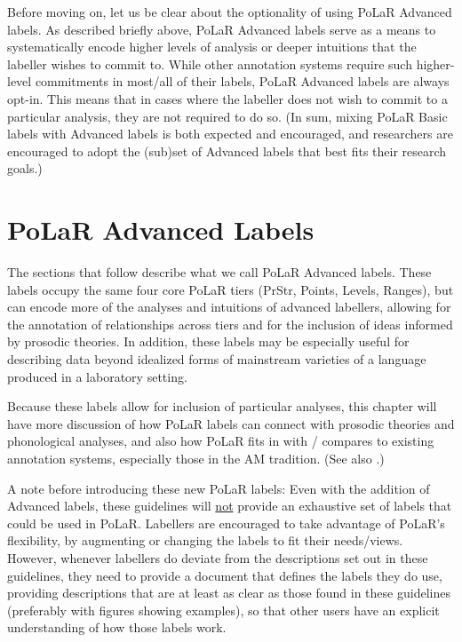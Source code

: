 Before moving on, let us be clear about the optionality of using PoLaR Advanced labels. As described briefly above, PoLaR Advanced labels serve as a means to systematically encode higher levels of analysis or deeper intuitions that the labeller wishes to commit to. While other annotation systems require such higher-level commitments in most\slash all of their labels, PoLaR Advanced labels are always opt-in. This means that in cases where the labeller does not wish to commit to a particular analysis, they are not required to do so. (In sum, mixing PoLaR Basic labels with Advanced labels is both expected and encouraged, and researchers are encouraged to adopt the (sub)set of Advanced labels that best fits their research goals.)

\section{PoLaR Advanced Labels}\label{sec:polar-advanced-labels}

The sections that follow describe what we call PoLaR Advanced labels. These labels occupy the same four core PoLaR tiers (PrStr, Points, Levels, Ranges), but can encode more of the analyses and intuitions of advanced labellers, allowing for the annotation of relationships across tiers and for the inclusion of ideas informed by prosodic theories. In addition, these labels may be especially useful for describing data beyond idealized forms of mainstream varieties of a language produced in a laboratory setting.

Because these labels allow for inclusion of particular analyses, this chapter will have more discussion of how PoLaR labels can connect with prosodic theories and phonological analyses, and also how PoLaR fits in with / compares to existing annotation systems, especially those in the AM tradition. (See also \citealt{ahn-19}.)

A note before introducing these new PoLaR labels: Even with the addition of Advanced labels, these guidelines will \uline{not} provide an exhaustive set of labels that could be used in PoLaR. Labellers are encouraged to take advantage of PoLaR’s flexibility, by augmenting or changing the labels to fit their needs\slash views. However, whenever labellers do deviate from the descriptions set out in these guidelines, they need to provide a document that defines the labels they do use, providing descriptions that are at least as clear as those found in these guidelines (preferably with figures showing examples), so that other users have an explicit understanding of how those labels work.

